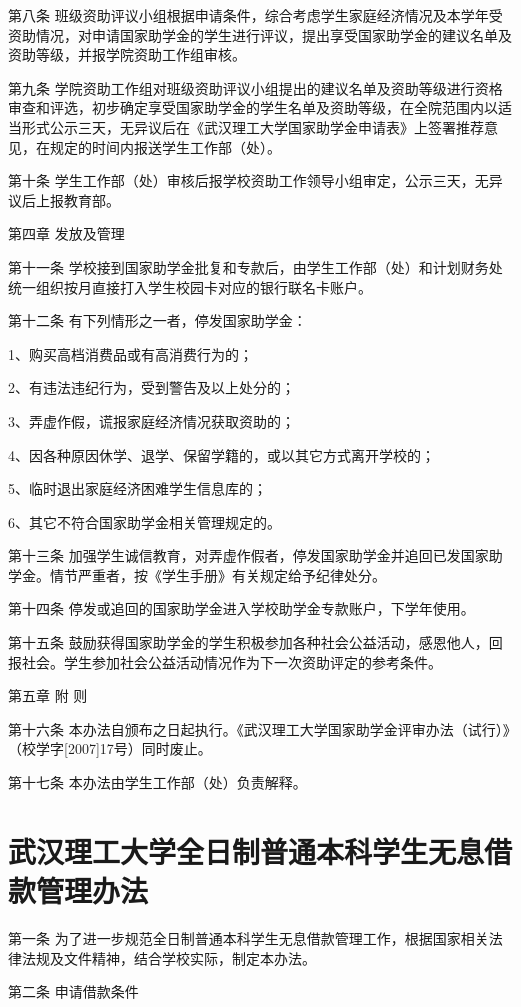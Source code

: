\documentclass[UTF8,12pt,a4paper]{report}
\begin{document}
第八条 班级资助评议小组根据申请条件，综合考虑学生家庭经济情况及本学年受资助情况，对申请国家助学金的学生进行评议，提出享受国家助学金的建议名单及资助等级，并报学院资助工作组审核。

第九条 学院资助工作组对班级资助评议小组提出的建议名单及资助等级进行资格审查和评选，初步确定享受国家助学金的学生名单及资助等级，在全院范围内以适当形式公示三天，无异议后在《武汉理工大学国家助学金申请表》上签署推荐意见，在规定的时间内报送学生工作部（处）。

第十条 学生工作部（处）审核后报学校资助工作领导小组审定，公示三天，无异议后上报教育部。

第四章 发放及管理

第十一条 学校接到国家助学金批复和专款后，由学生工作部（处）和计划财务处统一组织按月直接打入学生校园卡对应的银行联名卡账户。

第十二条 有下列情形之一者，停发国家助学金：

1、购买高档消费品或有高消费行为的；

2、有违法违纪行为，受到警告及以上处分的；

3、弄虚作假，谎报家庭经济情况获取资助的；

4、因各种原因休学、退学、保留学籍的，或以其它方式离开学校的；

5、临时退出家庭经济困难学生信息库的；

6、其它不符合国家助学金相关管理规定的。

第十三条 加强学生诚信教育，对弄虚作假者，停发国家助学金并追回已发国家助学金。情节严重者，按《学生手册》有关规定给予纪律处分。

第十四条 停发或追回的国家助学金进入学校助学金专款账户，下学年使用。

第十五条 鼓励获得国家助学金的学生积极参加各种社会公益活动，感恩他人，回报社会。学生参加社会公益活动情况作为下一次资助评定的参考条件。

第五章 附 则

第十六条 本办法自颁布之日起执行。《武汉理工大学国家助学金评审办法（试行）》（校学字[2007]17号）同时废止。

第十七条 本办法由学生工作部（处）负责解释。

\chapter{武汉理工大学全日制普通本科学生无息借款管理办法}
第一条 为了进一步规范全日制普通本科学生无息借款管理工作，根据国家相关法律法规及文件精神，结合学校实际，制定本办法。

第二条 申请借款条件
\end{document}
